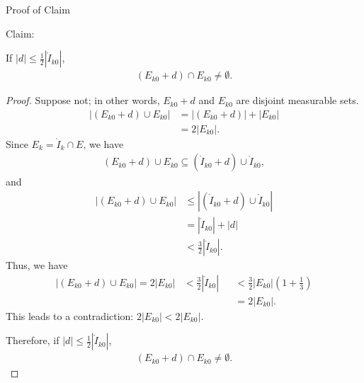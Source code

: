 \documentclass[UTF8,a4paper,10pt]{article}
\begin{document}
\begin{mybox}{Proof of Claim}

  Claim: 

If \(|d| \leq \frac{1}{2}|\mathring{I}_{k0}|\),
\begin{equation*}
  \begin{aligned}
    (E_{k0} + d)\cap E_{k0} \neq \emptyset.
  \end{aligned}
\end{equation*}

\begin{proof}
  Suppose not; in other words, \(E_{k0} + d \) and \(E_{k0}\) are disjoint measurable sets.
  \begin{equation*}
    \begin{aligned}
      |(E_{k0} + d)\cup E_{k0}| &= |(E_{k0} + d)| + |E_{k0}| \\
      &= 2|E_{k0}|.
    \end{aligned}
  \end{equation*}
  Since \(E_k = \mathring{I}_k\cap E\), we have
  \begin{equation*}
    \begin{aligned}
      (E_{k0} + d)\cup E_{k0} \subseteq (\mathring{I}_{k0} + d) \cup \mathring{I}_{k0},
    \end{aligned}
  \end{equation*}
  and
  \begin{equation*}
    \begin{aligned}
      |(E_{k0} + d)\cup E_{k0}| 
      &\leq |(\mathring{I}_{k0} + d) \cup \mathring{I}_{k0}|\\
      &= |\mathring{I}_{k0}| + |d|\\
      &< \frac{3}{2} |\mathring{I}_{k0}|.
    \end{aligned}
  \end{equation*}
  Thus, we have
  \begin{equation*}
    \begin{aligned}
      |(E_{k0} + d)\cup E_{k0}|  = 2|E_{k0}|
      &< \frac{3}{2} |\mathring{I}_{k0}| &&< \frac{3}{2} |E_{k0}|(1+\frac{1}{3})\\
      &&&=2|E_{k0}|.
    \end{aligned}
  \end{equation*}
  This leads to a contradiction: \(2|E_{k0}|<2|E_{k0}|\).

  Therefore, if \(|d| \leq \frac{1}{2}|\mathring{I}_{k0}|\),
  \begin{equation*}
    \begin{aligned}
      (E_{k0} + d)\cap E_{k0} \neq \emptyset.
    \end{aligned}
  \end{equation*}

\end{proof}


\end{mybox}
\end{document}
